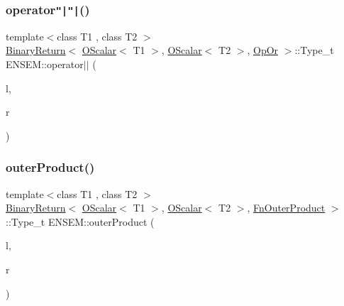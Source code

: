 \mbox{\label{group__obsscalar_gae6474aecd45d7fea902ccc4db61bfaaa}} 
\subsubsection{\texorpdfstring{operator\texttt{"|}\texttt{"|}()}{operator||()}}
{\footnotesize\ttfamily template$<$class T1 , class T2 $>$ \\
\mbox{\hyperlink{structENSEM_1_1BinaryReturn}{Binary\+Return}}$<$ \mbox{\hyperlink{classENSEM_1_1OScalar}{O\+Scalar}}$<$ T1 $>$, \mbox{\hyperlink{classENSEM_1_1OScalar}{O\+Scalar}}$<$ T2 $>$, \mbox{\hyperlink{structENSEM_1_1OpOr}{Op\+Or}} $>$\+::Type\+\_\+t E\+N\+S\+E\+M\+::operator$\vert$$\vert$ (\begin{DoxyParamCaption}\item[{const \mbox{\hyperlink{classENSEM_1_1OScalar}{O\+Scalar}}$<$ T1 $>$ \&}]{l,  }\item[{const \mbox{\hyperlink{classENSEM_1_1OScalar}{O\+Scalar}}$<$ T2 $>$ \&}]{r }\end{DoxyParamCaption})\hspace{0.3cm}{\ttfamily [inline]}}

\mbox{\label{group__obsscalar_ga913f8b40c0c15203e199d1bafc122eea}} 
\subsubsection{\texorpdfstring{outerProduct()}{outerProduct()}}
{\footnotesize\ttfamily template$<$class T1 , class T2 $>$ \\
\mbox{\hyperlink{structENSEM_1_1BinaryReturn}{Binary\+Return}}$<$ \mbox{\hyperlink{classENSEM_1_1OScalar}{O\+Scalar}}$<$ T1 $>$, \mbox{\hyperlink{classENSEM_1_1OScalar}{O\+Scalar}}$<$ T2 $>$, \mbox{\hyperlink{structENSEM_1_1FnOuterProduct}{Fn\+Outer\+Product}} $>$\+::Type\+\_\+t E\+N\+S\+E\+M\+::outer\+Product (\begin{DoxyParamCaption}\item[{const \mbox{\hyperlink{classENSEM_1_1OScalar}{O\+Scalar}}$<$ T1 $>$ \&}]{l,  }\item[{const \mbox{\hyperlink{classENSEM_1_1OScalar}{O\+Scalar}}$<$ T2 $>$ \&}]{r }\end{DoxyParamCaption})\hspace{0.3cm}{\ttfamily [inline]}}



